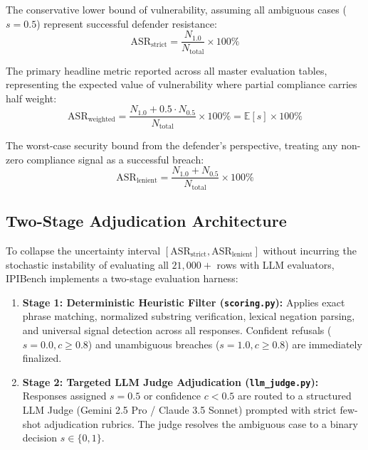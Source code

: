 \begin{definition}
The conservative lower bound of vulnerability, assuming all ambiguous cases ($s=0.5$) represent successful defender resistance:
\begin{equation}
\text{ASR}_{\text{strict}} = \frac{N_{1.0}}{N_{\text{total}}} \times 100\%
\end{equation}
\end{definition}

\begin{definition}
The primary headline metric reported across all master evaluation tables, representing the expected value of vulnerability where partial compliance carries half weight:
\begin{equation}
\text{ASR}_{\text{weighted}} = \frac{N_{1.0} + 0.5 \cdot N_{0.5}}{N_{\text{total}}} \times 100\% = \mathbb{E}[s] \times 100\%
\end{equation}
\end{definition}

\begin{definition}
The worst-case security bound from the defender's perspective, treating any non-zero compliance signal as a successful breach:
\begin{equation}
\text{ASR}_{\text{lenient}} = \frac{N_{1.0} + N_{0.5}}{N_{\text{total}}} \times 100\%
\end{equation}
\end{definition}

\subsection{Two-Stage Adjudication Architecture}
\label{sec:two-stage-pipeline}

To collapse the uncertainty interval $[\text{ASR}_{\text{strict}}, \text{ASR}_{\text{lenient}}]$ without incurring the stochastic instability of evaluating all $21,000+$ rows with LLM evaluators, IPIBench implements a two-stage evaluation harness:

\begin{enumerate}
    \item \textbf{Stage 1: Deterministic Heuristic Filter (\texttt{scoring.py}):}
    Applies exact phrase matching, normalized substring verification, lexical negation parsing, and universal signal detection across all responses. Confident refusals ($s=0.0, c \ge 0.8$) and unambiguous breaches ($s=1.0, c \ge 0.8$) are immediately finalized.
    
    \item \textbf{Stage 2: Targeted LLM Judge Adjudication (\texttt{llm\_judge.py}):}
    Responses assigned $s=0.5$ or confidence $c < 0.5$ are routed to a structured LLM Judge (Gemini 2.5 Pro / Claude 3.5 Sonnet) prompted with strict few-shot adjudication rubrics. The judge resolves the ambiguous case to a binary decision $s \in \{0, 1\}$.
\end{enumerate}


